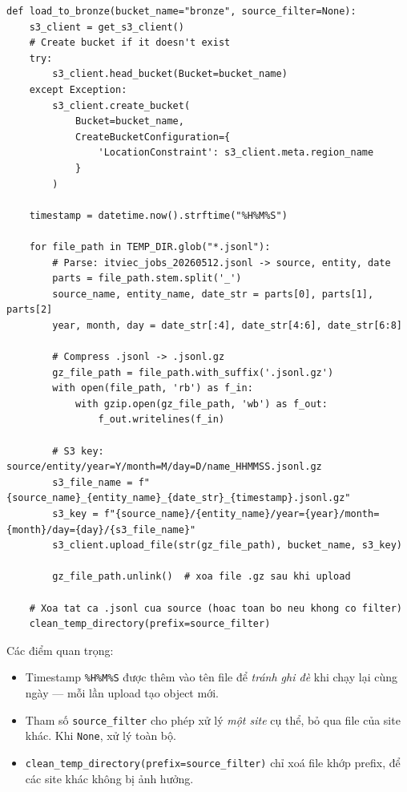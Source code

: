 \begin{lstlisting}[caption={\texttt{src/crawl\_layer/utils/loader.py} --- \texttt{load\_to\_bronze()} (trích đoạn chính)}, label={lst:load-to-bronze}]
def load_to_bronze(bucket_name="bronze", source_filter=None):
    s3_client = get_s3_client()
    # Create bucket if it doesn't exist
    try:
        s3_client.head_bucket(Bucket=bucket_name)
    except Exception:
        s3_client.create_bucket(
            Bucket=bucket_name,
            CreateBucketConfiguration={
                'LocationConstraint': s3_client.meta.region_name
            }
        )

    timestamp = datetime.now().strftime("%H%M%S")

    for file_path in TEMP_DIR.glob("*.jsonl"):
        # Parse: itviec_jobs_20260512.jsonl -> source, entity, date
        parts = file_path.stem.split('_')
        source_name, entity_name, date_str = parts[0], parts[1], parts[2]
        year, month, day = date_str[:4], date_str[4:6], date_str[6:8]

        # Compress .jsonl -> .jsonl.gz
        gz_file_path = file_path.with_suffix('.jsonl.gz')
        with open(file_path, 'rb') as f_in:
            with gzip.open(gz_file_path, 'wb') as f_out:
                f_out.writelines(f_in)

        # S3 key: source/entity/year=Y/month=M/day=D/name_HHMMSS.jsonl.gz
        s3_file_name = f"{source_name}_{entity_name}_{date_str}_{timestamp}.jsonl.gz"
        s3_key = f"{source_name}/{entity_name}/year={year}/month={month}/day={day}/{s3_file_name}"
        s3_client.upload_file(str(gz_file_path), bucket_name, s3_key)

        gz_file_path.unlink()  # xoa file .gz sau khi upload

    # Xoa tat ca .jsonl cua source (hoac toan bo neu khong co filter)
    clean_temp_directory(prefix=source_filter)
\end{lstlisting}

Các điểm quan trọng:
\begin{itemize}
    \item Timestamp \texttt{\%H\%M\%S} được thêm vào tên file để \emph{tránh
    ghi đè} khi chạy lại cùng ngày --- mỗi lần upload tạo object mới.
    \item Tham số \texttt{source\_filter} cho phép xử lý \emph{một site} cụ
    thể, bỏ qua file của site khác. Khi \texttt{None}, xử lý toàn bộ.
    \item \texttt{clean\_temp\_directory(prefix=source\_filter)} chỉ xoá file
    khớp prefix, để các site khác không bị ảnh hưởng.
\end{itemize}

